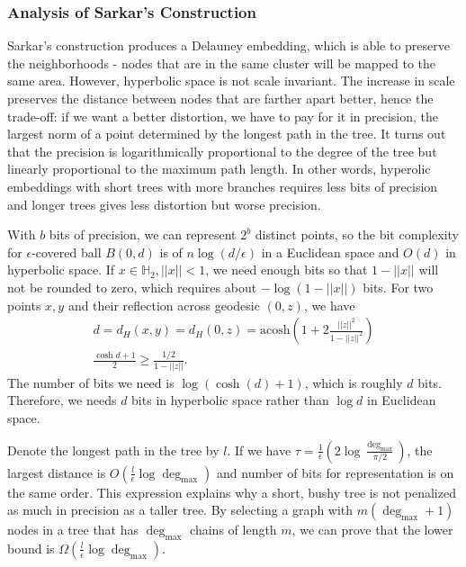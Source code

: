 \subsubsection{Analysis of Sarkar's Construction}

Sarkar's construction produces a Delauney embedding, which is able to preserve the neighborhoods - nodes that are in the same cluster will be mapped to the same area. However, hyperbolic space is not scale invariant. The increase in scale preserves the distance between nodes that are farther apart better, hence the trade-off: if we want a better distortion, we have to pay for it in precision, the largest norm of a point determined by the longest path in the tree. It turns out that the precision is logarithmically proportional to the degree of the tree but linearly proportional to the maximum path length. In other words, hyperolic embeddings with short trees with more branches requires less bits of precision and longer trees gives less distortion but worse precision.  

With $b$ bits of precision, we can represent $2^b$ distinct points, so the bit complexity for $\epsilon$-covered ball $B(0, d)$ is of $n\log(d/\epsilon)$ in a Euclidean space and $O(d)$ in hyperbolic space. If $x \in \mathbb{H}_2, ||x|| < 1$, we need enough bits so that $1 - ||x||$ will not be rounded to zero, which requires about $ -\log(1 - ||x||)$ bits. For two points $x, y$ and their reflection across geodesic $(0, z)$, we have 
\begin{align*}
    d = d_H(x, y) = d_H(0, z) = \text{acosh}(1 + 2 \frac{||z||^2}{1 - ||z||^2})\\
    \frac{\cosh{d}+1}{2} \geq \frac{1/2}{1 - ||z||}.
\end{align*}
The number of bits we need is $\log(\cosh(d)+1)$, which is roughly $d$ bits. Therefore, we needs $d$ bits in hyperbolic space rather than $\log d$ in Euclidean space. 

Denote the longest path in the tree by $l$. If we have $\tau = \frac{1}{\epsilon}(2 \log \frac{\deg_{\max}}{\pi/2})$, the largest distance is $O(\frac{l}{\epsilon} \log \deg_{\max})$ and number of bits for representation is on the same order. This expression explains why a short, bushy tree is not penalized as much in precision as a taller tree. By selecting a graph with $m(\deg_{\max} + 1)$ nodes in a tree that has $\deg_{\max}$ chains of length $m$, we can prove that the lower bound is $\Omega(\frac{l}{\epsilon} \log \deg_{\max})$.

